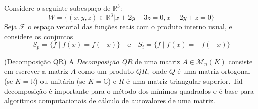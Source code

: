 \documentclass[11pt,a4paper]{article}
\begin{document}
 Considere o seguinte subespaço de $\mathbb{R}^3:$
\[
W = \{ (x,y,z) \in \mathbb{R}^3 |x + 2y - 3z = 0, x - 2y + z = 0 \}
\]
\solucao{}
 Seja $\mathcal{F}$ o espaço vetorial das funções reais com o produto interno usual, e considere os conjuntos
\[
S_p = \{ f \mid f(x) = f(-x) \} \quad \mbox{e} \quad S_i = \{ f \mid f(x) = -f(-x) \}
\]

\solucao{}

 (Decomposição QR) A \emph{Decomposição QR} de uma matriz $A \in \mathcal{M}_n(K)$ consiste em escrever a matriz $A$ como um produto $QR,$ onde $Q$ é uma matriz ortogonal (se $K = \mathbb{R}$) ou unitária (se $K = \mathbb{C}$) e $R$ é uma matriz triangular superior. Tal decomposição é importante para o método dos mínimos quadrados e é base para algoritmos computacionais de cálculo de autovalores de uma matriz. 
\solucao{}
\end{document}
